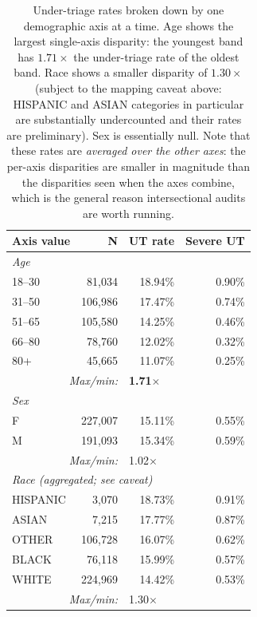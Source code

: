 \begin{table}[htbp]
 \centering
 \caption[Single-axis under-triage rates]{Under-triage rates broken down by one demographic axis at a time. Age shows the largest single-axis disparity: the youngest band has $1.71\times$ the under-triage rate of the oldest band. Race shows a smaller disparity of $1.30\times$ (subject to the mapping caveat above: HISPANIC and ASIAN categories in particular are substantially undercounted and their rates are preliminary). Sex is essentially null. Note that these rates are \emph{averaged over the other axes}: the per-axis disparities are smaller in magnitude than the disparities seen when the axes combine, which is the general reason intersectional audits are worth running.}
 \label{tab:single-axis}
 \small
 \begin{tabular}{lrrr}
 \toprule
 Axis value & N & UT rate & Severe UT \\
 \midrule
 \multicolumn{4}{l}{\textit{Age}} \\
 18--30 & 81{,}034 & 18.94\% & 0.90\% \\
 31--50 & 106{,}986 & 17.47\% & 0.74\% \\
 51--65 & 105{,}580 & 14.25\% & 0.46\% \\
 66--80 & 78{,}760 & 12.02\% & 0.32\% \\
 80+ & 45{,}665 & 11.07\% & 0.25\% \\
 \multicolumn{2}{r}{\textit{Max/min:}} & \multicolumn{2}{l}{\textbf{1.71$\times$}} \\
 \midrule
 \multicolumn{4}{l}{\textit{Sex}} \\
 F & 227{,}007 & 15.11\% & 0.55\% \\
 M & 191{,}093 & 15.34\% & 0.59\% \\
 \multicolumn{2}{r}{\textit{Max/min:}} & \multicolumn{2}{l}{1.02$\times$} \\
 \midrule
 \multicolumn{4}{l}{\textit{Race (aggregated; see caveat)}} \\
 HISPANIC & 3{,}070 & 18.73\% & 0.91\% \\
 ASIAN & 7{,}215 & 17.77\% & 0.87\% \\
 OTHER & 106{,}728 & 16.07\% & 0.62\% \\
 BLACK & 76{,}118 & 15.99\% & 0.57\% \\
 WHITE & 224{,}969 & 14.42\% & 0.53\% \\
 \multicolumn{2}{r}{\textit{Max/min:}} & \multicolumn{2}{l}{1.30$\times$} \\
 \bottomrule
 \end{tabular}
\end{table}

